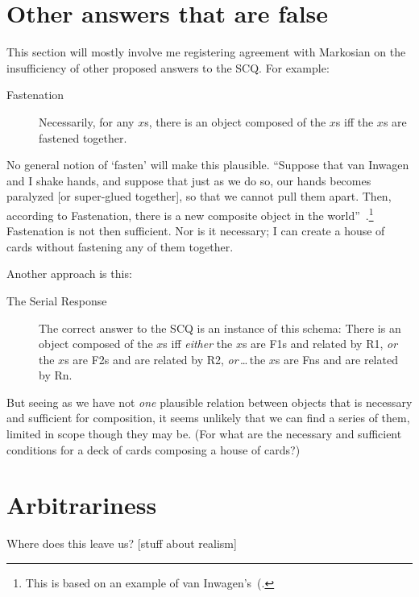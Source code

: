 \section{Other answers that are false}
This section will mostly involve me registering agreement with Markosian on the insufficiency of other proposed answers to the SCQ. For example:
\begin{description}
	\item[Fastenation] Necessarily, for any $x$s, there is an object composed of the $x$s iff the $x$s are fastened together.~\citep[223]{markosian1998a}
\end{description}
No general notion of `fasten' will make this plausible. ``Suppose that van Inwagen and I shake hands, and suppose that just as we do so, our hands becomes paralyzed [or super-glued together], so that we cannot pull them apart. Then, according to Fastenation, there is a new composite object in the world''~\citep[224]{markosian1998a}.\footnote{This is based on an example of van Inwagen's~(\citeyear[57--58]{inwagen1995}.} Fastenation is not then sufficient. Nor is it necessary; I can create a house of cards without fastening any of them together.

Another approach is this:
\begin{description}
	\item[The Serial Response] The correct answer to the SCQ is an instance of this schema: There is an object composed of the $x$s iff {\em either} the $x$s are F1s and related by R1, {\em or} the $x$s are F2s and are related by R2, {\em or}\,\ldots\,the $x$s are Fns and are related by Rn.~\citep[230]{markosian1998a}
\end{description}
But seeing as we have not {\em one} plausible relation between objects that is necessary and sufficient for composition, it seems unlikely that we can find a series of them, limited in scope though they may be. (For what are the necessary and sufficient conditions for a deck of cards composing a house of cards?)

\section{Arbitrariness}
Where does this leave us? [stuff about realism]

%
%
%
%
